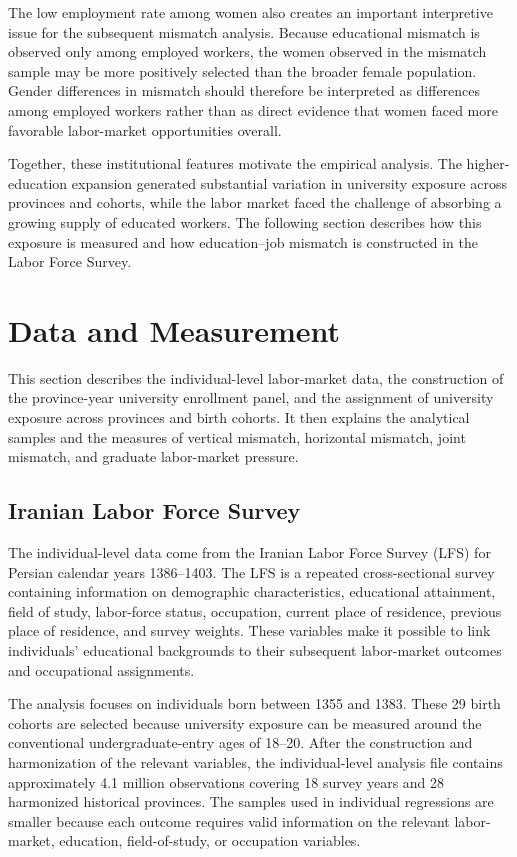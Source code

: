 The low employment rate among women also creates an important interpretive issue for the subsequent mismatch analysis. Because educational mismatch is observed only among employed workers, the women observed in the mismatch sample may be more positively selected than the broader female population. Gender differences in mismatch should therefore be interpreted as differences among employed workers rather than as direct evidence that women faced more favorable labor-market opportunities overall.

Together, these institutional features motivate the empirical analysis. The higher-education expansion generated substantial variation in university exposure across provinces and cohorts, while the labor market faced the challenge of absorbing a growing supply of educated workers. The following section describes how this exposure is measured and how education--job mismatch is constructed in the Labor Force Survey.

\section{Data and Measurement}
\label{sec:data}

This section describes the individual-level labor-market data, the construction of the province-year university enrollment panel, and the assignment of university exposure across provinces and birth cohorts. It then explains the analytical samples and the measures of vertical mismatch, horizontal mismatch, joint mismatch, and graduate labor-market pressure.

\subsection{Iranian Labor Force Survey}

The individual-level data come from the Iranian Labor Force Survey (LFS) for Persian calendar years 1386--1403. The LFS is a repeated cross-sectional survey containing information on demographic characteristics, educational attainment, field of study, labor-force status, occupation, current place of residence, previous place of residence, and survey weights. These variables make it possible to link individuals' educational backgrounds to their subsequent labor-market outcomes and occupational assignments.

The analysis focuses on individuals born between 1355 and 1383. These 29 birth cohorts are selected because university exposure can be measured around the conventional undergraduate-entry ages of 18--20. After the construction and harmonization of the relevant variables, the individual-level analysis file contains approximately 4.1 million observations covering 18 survey years and 28 harmonized historical provinces. The samples used in individual regressions are smaller because each outcome requires valid information on the relevant labor-market, education, field-of-study, or occupation variables.

